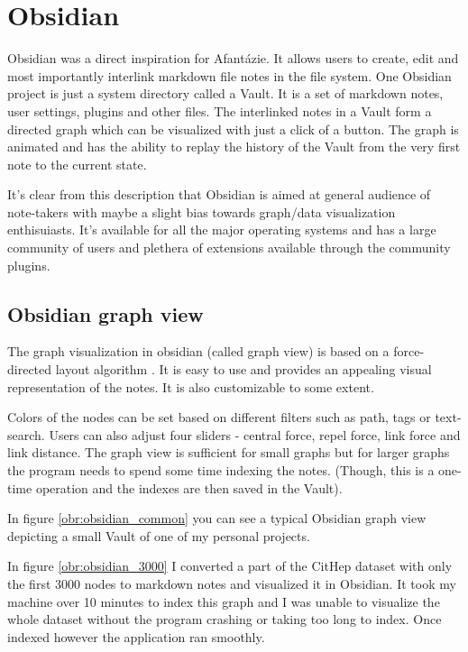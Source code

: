 \section{Obsidian}

Obsidian was a direct inspiration for Afantázie. It allows users to create, edit and most importantly interlink markdown file notes in the file system.
One Obsidian project is just a system directory called a Vault. It is a set of markdown notes, user settings, plugins and other files.
The interlinked notes in a Vault form a directed graph which can be visualized with just a click of a button.
The graph is animated and has the ability to replay the history of the Vault from the very first note to the current state.

It's clear from this description that Obsidian is aimed at general audience of note-takers 
with maybe a slight bias towards graph/data visualization enthisuiasts.
It's available for all the major operating systems and has a large community of users and plethera of extensions available through the
community plugins.

\subsection{Obsidian graph view}

The graph visualization in obsidian (called graph view) is based on a force-directed layout algorithm .
It is easy to use and provides an appealing visual representation of the notes. It is also customizable to some extent.

Colors of the nodes can be set based on different filters such as path, tags or text-search.
Users can also adjust four sliders - central force, repel force, link force and link distance.
The graph view is sufficient for small graphs but for larger graphs the program needs to spend some time indexing the notes.
(Though, this is a one-time operation and the indexes are then saved in the Vault).

In figure \ref{obr:obsidian_common} you can see a typical Obsidian graph view depicting a small Vault of one of my personal projects.

In figure \ref{obr:obsidian_3000} I converted a part of the CitHep dataset with only the first 3000 nodes to markdown notes and visualized it in Obsidian.
It took my machine over 10 minutes to index this graph and I was unable to visualize the whole dataset without the program crashing or taking too long to index.
Once indexed however the application ran smoothly.

